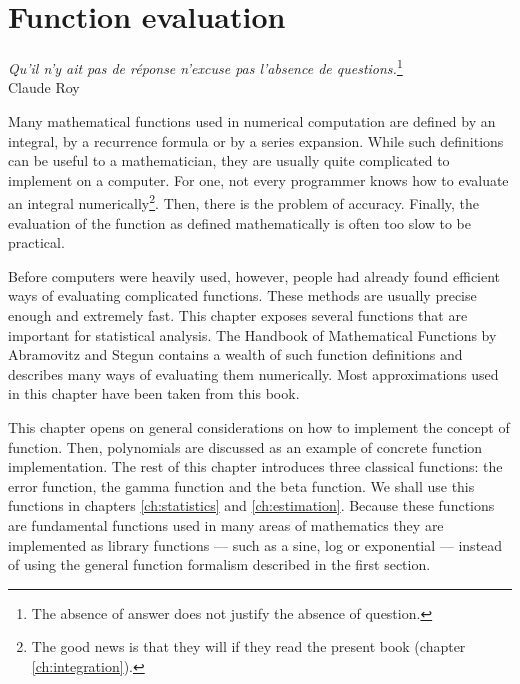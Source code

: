 \documentclass[twoside]{book}
\begin{document}
\fi

\chapter{Function evaluation}
\label{ch:function} \vspace{1 ex}
\begin{flushright}
{\sl Qu'il n'y ait pas de r\'eponse n'excuse pas l'absence de
questions.}\footnote{The absence of answer does not justify the
absence of question.}\\ Claude Roy
\end{flushright}
\vspace{1 ex} Many mathematical functions used in numerical
computation are defined by an integral, by a recurrence formula or
by a series expansion. While such definitions can be useful to a
mathematician, they are usually quite complicated to implement on
a computer. For one, not every programmer knows how to evaluate an
integral numerically\footnote{The good news is that they will if
they read the present book (\cf chapter \ref{ch:integration}).}.
Then, there is the problem of accuracy. Finally, the evaluation of
the function as defined mathematically is often too slow to be
practical.

Before computers were heavily used, however, people had already
found efficient ways of evaluating complicated functions. These
methods are usually precise enough and extremely fast. This
chapter exposes several functions that are important for
statistical analysis. The Handbook of Mathematical Functions by
Abramovitz and Stegun \cite{AbrSteg} contains a wealth of such
function definitions and describes many ways of evaluating them
numerically. Most approximations used in this chapter have been
taken from this book.

This chapter opens on general considerations on how to implement
the concept of function. Then, polynomials are discussed as an
example of concrete function implementation. The rest of this
chapter introduces three classical functions: the error function,
the gamma function and the beta function. We shall use this
functions in chapters \ref{ch:statistics} and \ref{ch:estimation}.
Because these functions are fundamental functions used in many
areas of mathematics they are implemented as library functions ---
such as a sine, log or exponential --- instead of using the
general function formalism described in the first section.
\end{document}
